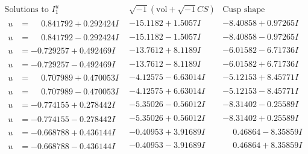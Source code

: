 \documentclass[1p]{elsarticle_modified}
\theoremstyle{definition}
\newcommand{\I}{\sqrt{-1}}
\begin{document}
$$\begin{array}{c|c|c}  
\text{Solutions to }I^u_{1}& \I (\text{vol} + \sqrt{-1}CS) & \text{Cusp shape}\\
 \hline 
\begin{aligned}
u &= \phantom{-}0.841792 + 0.292424 I\end{aligned}
 & -15.1182 + 1.5057 I & -8.40858 + 0.97265 I \\ \hline\begin{aligned}
u &= \phantom{-}0.841792 - 0.292424 I\end{aligned}
 & -15.1182 - 1.5057 I & -8.40858 - 0.97265 I \\ \hline\begin{aligned}
u &= -0.729257 + 0.492469 I\end{aligned}
 & -13.7612 + 8.1189 I & -6.01582 - 6.71736 I \\ \hline\begin{aligned}
u &= -0.729257 - 0.492469 I\end{aligned}
 & -13.7612 - 8.1189 I & -6.01582 + 6.71736 I \\ \hline\begin{aligned}
u &= \phantom{-}0.707989 + 0.470053 I\end{aligned}
 & -4.12575 - 6.63014 I & -5.12153 + 8.45771 I \\ \hline\begin{aligned}
u &= \phantom{-}0.707989 - 0.470053 I\end{aligned}
 & -4.12575 + 6.63014 I & -5.12153 - 8.45771 I \\ \hline\begin{aligned}
u &= -0.774155 + 0.278442 I\end{aligned}
 & -5.35026 - 0.56012 I & -8.31402 - 0.25589 I \\ \hline\begin{aligned}
u &= -0.774155 - 0.278442 I\end{aligned}
 & -5.35026 + 0.56012 I & -8.31402 + 0.25589 I \\ \hline\begin{aligned}
u &= -0.668788 + 0.436144 I\end{aligned}
 & -0.40953 + 3.91689 I & \phantom{-}0.46864 - 8.35859 I \\ \hline\begin{aligned}
u &= -0.668788 - 0.436144 I\end{aligned}
 & -0.40953 - 3.91689 I & \phantom{-}0.46864 + 8.35859 I \\ \hline\begin{aligned}

\end{aligned}
\end{array}$$
\end{document}

